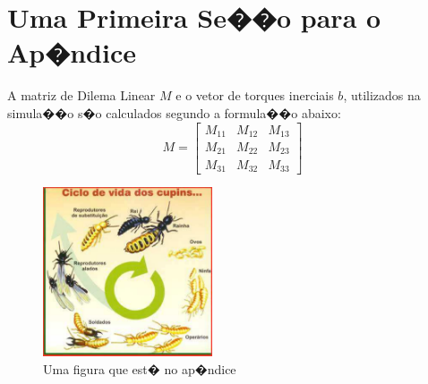 \section{Uma Primeira Se��o para o Ap�ndice}

A matriz de Dilema Linear $M$ e o vetor de torques inerciais $b$,
utilizados na simula��o s�o calculados segundo a formula��o 
abaixo:
\begin{equation}
M=\left[ \begin{array}{ccc}
M_{11} & M_{12} & M_{13} \\
M_{21} & M_{22} & M_{23} \\
M_{31} & M_{32} & M_{33}
\end{array} \right]
\end{equation}

\begin{figure}[h]
\centering
\includegraphics[height=5cm, width=5cm]{ApeA/pragas_ciclo_cupim}
\caption{Uma figura que est� no ap�ndice}\label{FD}
\end{figure}
